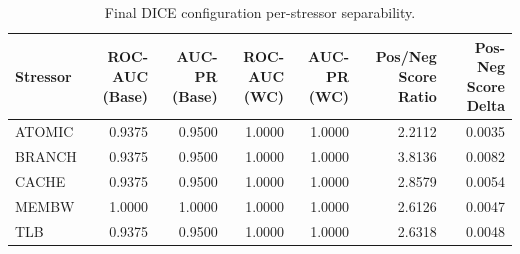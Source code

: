 \begin{table}[t]
\centering
\caption{Final DICE configuration per-stressor separability.}
\label{tab:dice_full_stressor}
\footnotesize
\begin{tabular}{lrrrrrr}
\toprule
Stressor & ROC-AUC (Base) & AUC-PR (Base) & ROC-AUC (WC) & AUC-PR (WC) & Pos/Neg Score Ratio & Pos-Neg Score Delta \\
\midrule
ATOMIC & 0.9375 & 0.9500 & 1.0000 & 1.0000 & 2.2112 & 0.0035 \\
BRANCH & 0.9375 & 0.9500 & 1.0000 & 1.0000 & 3.8136 & 0.0082 \\
CACHE & 0.9375 & 0.9500 & 1.0000 & 1.0000 & 2.8579 & 0.0054 \\
MEMBW & 1.0000 & 1.0000 & 1.0000 & 1.0000 & 2.6126 & 0.0047 \\
TLB & 0.9375 & 0.9500 & 1.0000 & 1.0000 & 2.6318 & 0.0048 \\
\bottomrule
\end{tabular}

\end{table}
